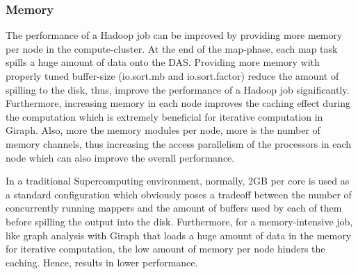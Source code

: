 \documentclass[conference]{IEEEtran}
\begin{document}
\subsubsection {Memory}
The performance of a Hadoop job can be improved by providing more memory per node in the compute-cluster. 
At the end of the map-phase, each map task spills a huge amount of data onto the DAS. 
Providing more memory with properly tuned buffer-size (io.sort.mb and io.sort.factor) reduce the amount of spilling to the disk, thus, improve the performance of a Hadoop job significantly.
Furthermore, increasing memory in each node improves the caching effect during the computation which is extremely beneficial for iterative computation in Giraph.
Also, more the memory modules per node, more is the number of memory channels, thus increasing the access parallelism of the processors in each node which can also improve the overall performance.

In a traditional Supercomputing environment, normally, 2GB per core is used as a standard configuration which obviously poses a tradeoff between the number of concurrently running mappers and the amount of buffers used by each of them before spilling the output into the disk. 
Furthermore, for a memory-intensive job, like graph analysis with Giraph that loads a huge amount of data in the memory for iterative computation, the low amount of memory per node hinders the caching. Hence, results in lower performance.

\end{document}

